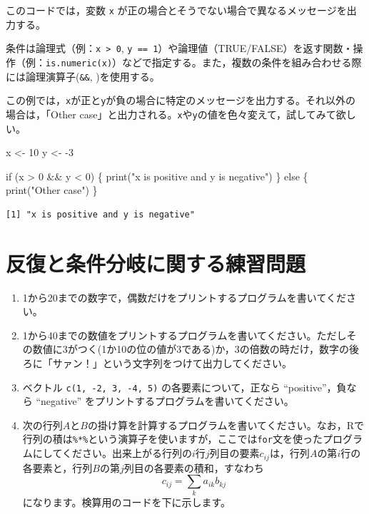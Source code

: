 \documentclass[
  a4paper,
]{ltjsbook}
\newenvironment{Shaded}{\begin{snugshade}}{\end{snugshade}}
\newcommand{\ControlFlowTok}[1]{\textcolor[rgb]{0.00,0.23,0.31}{#1}}
\newcommand{\DecValTok}[1]{\textcolor[rgb]{0.68,0.00,0.00}{#1}}
\newcommand{\FunctionTok}[1]{\textcolor[rgb]{0.28,0.35,0.67}{#1}}
\newcommand{\NormalTok}[1]{\textcolor[rgb]{0.00,0.23,0.31}{#1}}
\newcommand{\OtherTok}[1]{\textcolor[rgb]{0.00,0.23,0.31}{#1}}
\newcommand{\SpecialCharTok}[1]{\textcolor[rgb]{0.37,0.37,0.37}{#1}}
\newcommand{\StringTok}[1]{\textcolor[rgb]{0.13,0.47,0.30}{#1}}
\providecommand{\tightlist}{%
  \setlength{\itemsep}{0pt}\setlength{\parskip}{0pt}}\usepackage{longtable,booktabs,array}
\begin{document}
このコードでは，変数 \texttt{x}
が正の場合とそうでない場合で異なるメッセージを出力する。

条件は論理式（例：\texttt{x\ \textgreater{}\ 0},
\texttt{y\ ==\ 1}）や論理値（TRUE/FALSE）を返す関数・操作（例：\texttt{is.numeric(x)}）などで指定する。また，複数の条件を組み合わせる際には論理演算子(\texttt{\&\&},
\texttt{\textbar{}\textbar{}})を使用する。

この例では，\texttt{x}が正と\texttt{y}が負の場合に特定のメッセージを出力する。それ以外の場合は，「Other
case」と出力される。\texttt{x}や\texttt{y}の値を色々変えて，試してみて欲しい。

\begin{Shaded}
\begin{Highlighting}[]
\NormalTok{x }\OtherTok{\textless{}{-}} \DecValTok{10}
\NormalTok{y }\OtherTok{\textless{}{-}} \SpecialCharTok{{-}}\DecValTok{3}

\ControlFlowTok{if}\NormalTok{ (x }\SpecialCharTok{\textgreater{}} \DecValTok{0} \SpecialCharTok{\&\&}\NormalTok{ y }\SpecialCharTok{\textless{}} \DecValTok{0}\NormalTok{) \{}
  \FunctionTok{print}\NormalTok{(}\StringTok{"x is positive and y is negative"}\NormalTok{)}
\NormalTok{\} }\ControlFlowTok{else}\NormalTok{ \{}
  \FunctionTok{print}\NormalTok{(}\StringTok{"Other case"}\NormalTok{)}
\NormalTok{\}}
\end{Highlighting}
\end{Shaded}

\begin{verbatim}
[1] "x is positive and y is negative"
\end{verbatim}

\section{反復と条件分岐に関する練習問題}\label{ux53cdux5fa9ux3068ux6761ux4ef6ux5206ux5c90ux306bux95a2ux3059ux308bux7df4ux7fd2ux554fux984c}

\begin{enumerate}
\def\labelenumi{\arabic{enumi}.}
\tightlist
\item
  1から20までの数字で，偶数だけをプリントするプログラムを書いてください。
\item
  1から40までの数値をプリントするプログラムを書いてください。ただしその数値に3がつく(1か10の位の値が3である)か，3の倍数の時だけ，数字の後ろに「サァン！」という文字列をつけて出力してください。
\item
  ベクトル \texttt{c(1,\ -2,\ 3,\ -4,\ 5)} の各要素について，正なら
  ``positive''，負なら ``negative''
  をプリントするプログラムを書いてください。
\item
  次の行列\(A\)と\(B\)の掛け算を計算するプログラムを書いてください。なお，Rで行列の積は\texttt{\%*\%}という演算子を使いますが，ここでは\texttt{for}文を使ったプログラムにしてください。出来上がる行列の\(i\)行\(j\)列目の要素\(c_{ij}\)は，行列\(A\)の第\(i\)行の各要素と，行列\(B\)の第\(j\)列目の各要素の積和，すなわち\[c_{ij}=\sum_{k} a_{ik}b_{kj}\]になります。検算用のコードを下に示します。
\end{enumerate}
\end{document}
